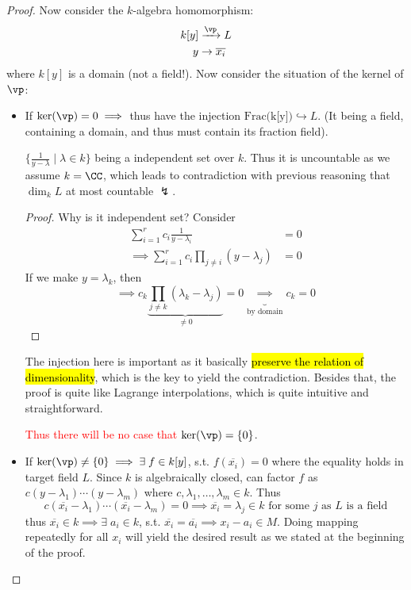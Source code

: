 \begin{proof}
	Now consider the \( k \)-algebra homomorphism:
	\[
		\begin{aligned}
			k[y] & \xrightarrow{\vp} L \\
			y    & \to \overline{x_i}
		\end{aligned}
	\]
	where \( k[y] \) is a domain (not a field!). Now consider the situation of the kernel of \( \vp \):
	\begin{itemize}
		\item If \( \ker(\vp) = 0 \implies \) thus have the injection  \(\text{Frac(k[y])} \hookrightarrow L \). (It being a field,
		      containing a domain, and thus must contain its fraction field).
		      \begin{note}
			      \( \{\frac{1}{y - \lambda} \; | \; \lambda \in k\} \) being a independent set over \( k \).
			      Thus it is uncountable as we assume \( k = \CC \), which leads to contradiction with
			      previous reasoning that \( \dim_k L \) at most countable \( \lightning \).
		      \end{note}
		      \begin{proof}
			      Why is it independent set? Consider
			      \[
				      \begin{aligned}
					      \sum_{i=1}^r c_i \frac{1}{y-\lambda_i}                    & = 0 \\
					      \implies \sum_{i=1}^r c_i \prod_{j \ne i} (y - \lambda_j) & = 0
				      \end{aligned}
			      \]
			      If we make \( y = \lambda_k \), then
			      \[
				      \implies c_k \underbrace{\prod_{j \ne k} (\lambda_k - \lambda_j)}_{\ne 0} = 0
				      \underbrace{\implies}_{\text{by domain}}
				      c_k = 0
			      \]
		      \end{proof}
		      \begin{note}
			      The injection here is important as it basically \hl{preserve the relation of dimensionality},
			      which is the key to yield the contradiction. Besides that, the proof is quite like
			      Lagrange interpolations, which is quite intuitive and straightforward.
		      \end{note}
		      \textcolor{red}{Thus there will be no case that \( \ker(\vp) = \{0\} \)}.
		\item If \( \ker(\vp) \ne \{0\}\implies \exists \; f \in k[y] \), s.t. \( f(\overline{x_i})
		      = 0 \) where the equality holds in target field \( L \). Since \( k \) is algebraically closed, can factor \( f \) as \(
		      c(y-\lambda_1)\cdots (y-\lambda_m) \) where \( c, \lambda_1,\ldots, \lambda_m \in k \).
		      Thus
		      \[
			      c(\overline{x_i} - \lambda_1) \cdots (\overline{x_i} - \lambda_m) = 0 \implies
			      \overline{x_i} = \lambda_j \in k \text{ for some } j \text{ as }L \text{ is a field}
		      \]
		      thus \( \overline{x_i} \in k \implies \exists \; a_i \in k\), s.t. \( \overline{x_i} =
		      \overline{a_i} \implies x_i - a_i \in M \). Doing mapping repeatedly for all \( x_i \)
		      will yield the desired result as we stated at the beginning of the proof.
	\end{itemize}
\end{proof}


